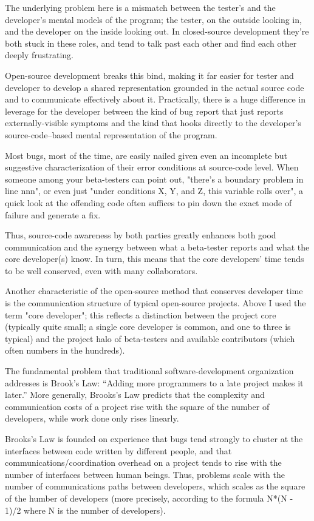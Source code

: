 \documentclass[a4paper,12pt,UTF8,twoside]{ctexbook}
\begin{document}
The underlying problem here is a mismatch between the tester's and the developer's mental models of the program; the tester, on the outside looking in, and the developer on the inside looking out. In closed-source development they're both stuck in these roles, and tend to talk past each other and find each other deeply frustrating.

Open-source development breaks this bind, making it far easier for tester and developer to develop a shared representation grounded in the actual source code and to communicate effectively about it. Practically, there is a huge difference in leverage for the developer between the kind of bug report that just reports externally-visible symptoms and the kind that hooks directly to the developer's source-code–based mental representation of the program.

Most bugs, most of the time, are easily nailed given even an incomplete but suggestive characterization of their error conditions at source-code level. When someone among your beta-testers can point out, "there's a boundary problem in line nnn", or even just "under conditions X, Y, and Z, this variable rolls over", a quick look at the offending code often suffices to pin down the exact mode of failure and generate a fix.

Thus, source-code awareness by both parties greatly enhances both good communication and the synergy between what a beta-tester reports and what the core developer(s) know. In turn, this means that the core developers' time tends to be well conserved, even with many collaborators.

Another characteristic of the open-source method that conserves developer time is the communication structure of typical open-source projects. Above I used the term "core developer"; this reflects a distinction between the project core (typically quite small; a single core developer is common, and one to three is typical) and the project halo of beta-testers and available contributors (which often numbers in the hundreds).

The fundamental problem that traditional software-development organization addresses is Brook's Law: ``Adding more programmers to a late project makes it later.'' More generally, Brooks's Law predicts that the complexity and communication costs of a project rise with the square of the number of developers, while work done only rises linearly.

Brooks's Law is founded on experience that bugs tend strongly to cluster at the interfaces between code written by different people, and that communications/coordination overhead on a project tends to rise with the number of interfaces between human beings. Thus, problems scale with the number of communications paths between developers, which scales as the square of the humber of developers (more precisely, according to the formula N*(N - 1)/2 where N is the number of developers).
\end{document}
